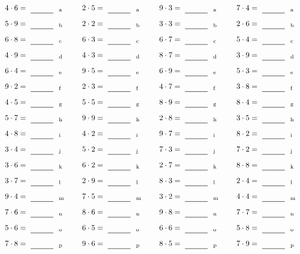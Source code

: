 \documentclass
[
  draft    = true,
  fontsize = 11pt,
  parskip  = half-
]
{scrartcl}
\begin{document}
\par\vfill\par
\begin{align*}
    \pline{4\cdot6}&=\rline{a}
  & \pline{2\cdot5}&=\rline{a}
  & \pline{9\cdot3}&=\rline{a}
  & \pline{7\cdot4}&=\rline{a} \\[1ex]
    \pline{5\cdot9}&=\rline{b}
  & \pline{2\cdot2}&=\rline{b}
  & \pline{3\cdot3}&=\rline{b}
  & \pline{2\cdot6}&=\rline{b} \\[1ex]
    \pline{6\cdot8}&=\rline{c}
  & \pline{6\cdot3}&=\rline{c}
  & \pline{6\cdot7}&=\rline{c}
  & \pline{5\cdot4}&=\rline{c} \\[1ex]
    \pline{4\cdot9}&=\rline{d}
  & \pline{4\cdot3}&=\rline{d}
  & \pline{8\cdot7}&=\rline{d}
  & \pline{3\cdot9}&=\rline{d} \\[1ex]
    \pline{6\cdot4}&=\rline{e}
  & \pline{9\cdot5}&=\rline{e}
  & \pline{6\cdot9}&=\rline{e}
  & \pline{5\cdot3}&=\rline{e} \\[1ex]
    \pline{9\cdot2}&=\rline{f}
  & \pline{2\cdot3}&=\rline{f}
  & \pline{4\cdot7}&=\rline{f}
  & \pline{3\cdot8}&=\rline{f} \\[1ex]
    \pline{4\cdot5}&=\rline{g}
  & \pline{5\cdot5}&=\rline{g}
  & \pline{8\cdot9}&=\rline{g}
  & \pline{8\cdot4}&=\rline{g} \\[1ex]
    \pline{5\cdot7}&=\rline{h}
  & \pline{9\cdot9}&=\rline{h}
  & \pline{2\cdot8}&=\rline{h}
  & \pline{3\cdot5}&=\rline{h} \\[1ex]
    \pline{4\cdot8}&=\rline{i}
  & \pline{4\cdot2}&=\rline{i}
  & \pline{9\cdot7}&=\rline{i}
  & \pline{8\cdot2}&=\rline{i} \\[1ex]
    \pline{3\cdot4}&=\rline{j}
  & \pline{5\cdot2}&=\rline{j}
  & \pline{7\cdot3}&=\rline{j}
  & \pline{7\cdot2}&=\rline{j} \\[1ex]
    \pline{3\cdot6}&=\rline{k}
  & \pline{6\cdot2}&=\rline{k}
  & \pline{2\cdot7}&=\rline{k}
  & \pline{8\cdot8}&=\rline{k} \\[1ex]
    \pline{3\cdot7}&=\rline{l}
  & \pline{2\cdot9}&=\rline{l}
  & \pline{8\cdot3}&=\rline{l}
  & \pline{2\cdot4}&=\rline{l} \\[1ex]
    \pline{9\cdot4}&=\rline{m}
  & \pline{7\cdot5}&=\rline{m}
  & \pline{3\cdot2}&=\rline{m}
  & \pline{4\cdot4}&=\rline{m} \\[1ex]
    \pline{7\cdot6}&=\rline{n}
  & \pline{8\cdot6}&=\rline{n}
  & \pline{9\cdot8}&=\rline{n}
  & \pline{7\cdot7}&=\rline{n} \\[1ex]
    \pline{5\cdot6}&=\rline{o}
  & \pline{6\cdot5}&=\rline{o}
  & \pline{6\cdot6}&=\rline{o}
  & \pline{5\cdot8}&=\rline{o} \\[1ex]
    \pline{7\cdot8}&=\rline{p}
  & \pline{9\cdot6}&=\rline{p}
  & \pline{8\cdot5}&=\rline{p}
  & \pline{7\cdot9}&=\rline{p}
\end{align*}
\end{document}
